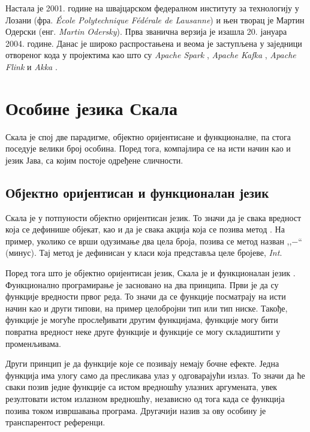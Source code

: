 \documentclass[12pt,oneside]{memoir}
\begin{document}
Настала је 2001. године на швајцарском федералном институту за технологију у Лозани (фра. \textit{École Polytechnique Fédérale de Lausanne}) и њен творац је Мартин Одерски (енг. \textit{Martin Odersky}). Прва званична верзија је изашла 20. јануара 2004. године. Данас је широко распростањена и веома је заступљена у заједници отвореног кода у пројектима као што су \textit{Apache Spark} \cite{apache_spark}, \textit{Apache Kafka} \cite{apache_kafka}, \textit{Apache Flink} \cite{apache_flink} и \textit{Akka} \cite{scala_akka}.

\section{Особине језика Скала}
\label{sec:osоб_scala}

Скала је спој две парадигме, објектно оријентисане и функционалне, па стога поседује велики број особина. Поред тога, компајлира се на исти начин као и језик Јава, са којим постоје одређене сличности.

\subsection{Објектно оријентисан и функционалан језик}
\label{subsec:scala_obj_prog}

Скала је у потпуности објектно оријентисан језик. То значи да је свака вредност која се дефинише објекат, као и да је свака акција која се позива метод \cite{scala_prog}. На пример, уколико се врши одузимање два цела броја, позива се метод назван ,,$-$`` (минус). Тај метод је дефинисан у класи која представља целе бројеве, \textit{Int}. 

Поред тога што је објектно оријентисан језик, Скала је и функционалан језик \cite{scala_prog}. Функционално програмирање је засновано на два принципа. Први је да су функције вредности првог реда. То значи да се функције посматрају на исти начин као и други типови, на пример целобројни тип или тип ниске. Такође, функције је могуће прослеђивати другим функцијама, функције могу бити повратна вредност неке друге функције и функције се могу складиштити у променљивама.

Други принцип је да функције које се позивају немају бочне ефекте. Једна функција има улогу само да пресликава улаз у одговарајући излаз. То значи да ће сваки позив једне функције са истом вредношћу улазних аргумената, увек резултовати истом излазном вредношћу, независно од тога када се функција позива током извршавања програма. Другачији назив за ову особину је транспарентост референци.
\end{document}

